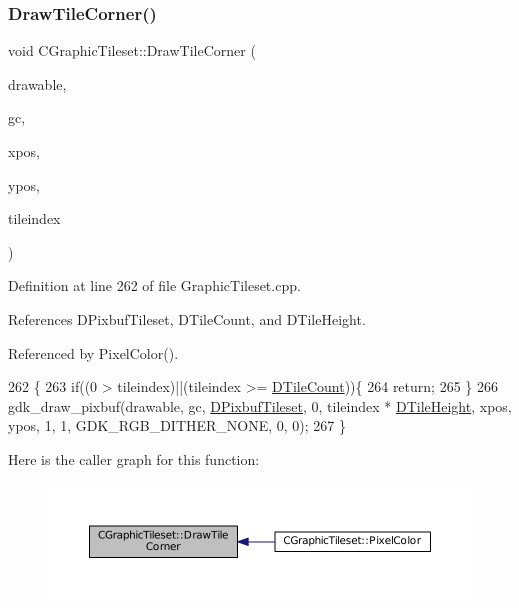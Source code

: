 \subsubsection{\texorpdfstring{Draw\+Tile\+Corner()}{DrawTileCorner()}}
{\footnotesize\ttfamily void C\+Graphic\+Tileset\+::\+Draw\+Tile\+Corner (\begin{DoxyParamCaption}\item[{Gdk\+Drawable $\ast$}]{drawable,  }\item[{Gdk\+GC $\ast$}]{gc,  }\item[{gint}]{xpos,  }\item[{gint}]{ypos,  }\item[{int}]{tileindex }\end{DoxyParamCaption})}



Definition at line 262 of file Graphic\+Tileset.\+cpp.



References D\+Pixbuf\+Tileset, D\+Tile\+Count, and D\+Tile\+Height.



Referenced by Pixel\+Color().


\begin{DoxyCode}
262                                                                                                          \{
263     \textcolor{keywordflow}{if}((0 > tileindex)||(tileindex >= \hyperlink{classCGraphicTileset_a39d942b370e47f441bf97385eb1037c8}{DTileCount}))\{
264         \textcolor{keywordflow}{return};
265     \}
266     gdk\_draw\_pixbuf(drawable, gc, \hyperlink{classCGraphicTileset_a5d5adfcdbb347a6df3f57535ca08e3ef}{DPixbufTileset}, 0, tileindex * 
      \hyperlink{classCGraphicTileset_af48f32e07d5fe69afd5f764318cc3244}{DTileHeight}, xpos, ypos, 1, 1, GDK\_RGB\_DITHER\_NONE, 0, 0);
267 \}
\end{DoxyCode}
Here is the caller graph for this function\+:\nopagebreak
\begin{figure}[H]
\begin{center}
\leavevmode
\includegraphics[width=350pt]{classCGraphicTileset_abf87dd71c8bf50b8878c66a5bdb2c7e7_icgraph}
\end{center}
\end{figure}
\hypertarget{classCGraphicTileset_a81114be934d1efca29eb194fc2429658}{}\label{classCGraphicTileset_a81114be934d1efca29eb194fc2429658} 
